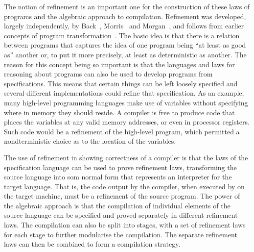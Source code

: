 \documentclass[a4paper,10pt]{report}
\begin{document}
The notion of refinement is an important one for the construction of these laws
of programs and the algebraic approach to compilation.  Refinement was
developed, largely independently, by Back~\cite{back1981},
Morris~\cite{morris1987} and Morgan~\cite{morgan1990}, and follows from earlier
concepts of program transformation~\cite{bauer1976, balzer1976, standish1976,
  arsac1979}.  The basic idea is that there is a relation between programs that
captures the idea of one program being ``at least as good as'' another or, to
put it more precisely, at least as deterministic as another.  The reason for
this concept being so important is that the languages and laws for reasoning
about programs can also be used to develop programs from specifications.  This
means that certain things can be left loosely specified and several different
implementations could refine that specification.  As an example, many high-level
programming languages make use of variables without specifying where in memory
they should reside.  A compiler is free to produce code that places the
variables at any valid memory addresses, or even in processor registers.  Such
code would be a refinement of the high-level program, which permitted a
nondterministic choice as to the location of the variables.

The use of refinement in showing correctness of a compiler is that the laws of
the specification language can be used to prove refinement laws, transforming
the source language into som normal form that represents an interpreter for the
target language.  That is, the code output by the compiler, when executed by on
the target machine, must be a refinement of the source program.  The power of
the algebraic approach is that the compilation of individual elements of the
source language can be specified and proved separately in different refinement
laws.  The compilation can also be split into stages, with a set of refinement
laws for each stage to further modularise the compilation.  The separate
refinement laws can then be combined to form a compilation strategy.
\end{document}
